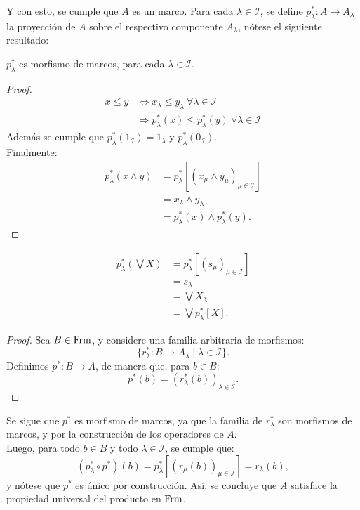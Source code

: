 Y con esto, se cumple que $A$ es un marco.
    Para cada $\lambda\in\mathscr{I}$, se define $p^*_\lambda:A\to A_\lambda$ la proyección de $A$ sobre el respectivo componente $A_\lambda$, nótese el siguiente resultado:
    \begin{lemma}
        $p^*_\lambda$ es morfismo de marcos, para cada $\lambda\in\mathscr{I}$.
    \end{lemma}
        \begin{proof}
            \begin{align*}
                x\leq y & \Longleftrightarrow x_\lambda\leq y_\lambda \ \forall\lambda\in\mathscr{I}\\
                & \Rightarrow p^*_\lambda(x)\leq p^*_\lambda(y)\ \forall\lambda\in\mathscr{I} 
            \end{align*}
            Además se cumple que $p^*_\lambda(1_\mathscr{I})=1_\lambda$ y $p^*_\lambda(0_\mathscr{I})$.\\
            Finalmente:
            \begin{align*}
                p^*_\lambda(x\wedge y) & = p^*_\lambda[(x_\mu\wedge y_\mu)_{\mu\in\mathscr{I}}]\\
                & = x_\lambda\wedge y_\lambda\\
                & = p^*_\lambda(x)\wedge p^*_\lambda(y).
            \end{align*}
        \end{proof}
\begin{align*}
    p^*_\lambda(\bigvee X) & = p^*_\lambda[(s_\mu)_{\mu\in\mathscr{I}}] \\
                           & = s_\lambda \\
                           & = \bigvee X_\lambda \\
                           & = \bigvee p^*_\lambda[X].
\end{align*}
\begin{proof}
    Sea $B\in\mathrm{Frm}$, y considere una familia arbitraria de morfismos:
    \begin{equation*}
        \{r^*_\lambda:B\to A_\lambda\mid\lambda\in\mathscr{I}\}.
    \end{equation*}
    Definimos $p^*:B\to A$, de manera que, para $b\in B$:
    \begin{equation*}
        p^*(b) = (r^*_\lambda(b))_{\lambda\in\mathscr{I}}.
    \end{equation*}
\end{proof}
Se sigue que $p^*$ es morfismo de marcos, ya que la familia de $r^*_\lambda$ son morfismos de marcos, y por la construcción de los operadores de $A$.\\
Luego, para todo $b\in B$ y todo $\lambda\in\mathscr{I}$, se cumple que:
\begin{equation*}
    (p^*_\lambda\circ p^*)(b) = p^*_\lambda[(r_\mu(b))_{\mu\in\mathscr{I}}] = r_\lambda(b),
\end{equation*}
y nótese que $p^*$ es único por construcción. Así, se concluye que $A$ satisface la propiedad universal del producto en $\mathrm{Frm}$.

